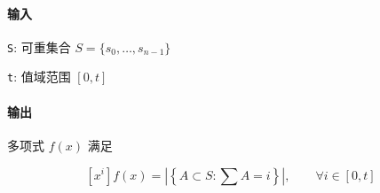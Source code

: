 \paragraph{输入}

\verb|S|: 可重集合 \(S=\{s_0,\dots,s_{n-1}\}\)

\verb|t|: 值域范围 \([0,t]\)

\paragraph{输出}

多项式 \(f(x)\) 满足

\[
    \left[x^i\right]f(x)=\left|\left\{A\subset S:\sum A=i\right\}\right|,\qquad \forall i\in[0,t]
\]
